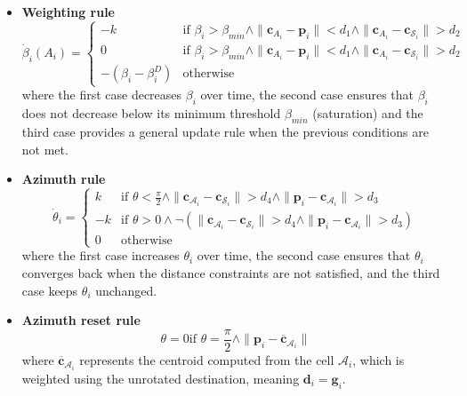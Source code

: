         \begin{itemize}
            \item \textbf{Weighting rule}
                \begin{equation}
                    \dot{\beta}_i(A_i) = 
                    \begin{cases}
                        -k & \text{if } \beta_i > \beta_{min} \land \|\mathbf{c}_{A_i} - \mathbf{p}_i\| < d_1 \land \|\mathbf{c}_{A_i} - \mathbf{c}_{\mathcal{S}_i}\| > d_2  \\
                        0  & \text{if } \beta_i > \beta_{min} \land \|\mathbf{c}_{A_i} - \mathbf{p}_i\| < d_1 \land \|\mathbf{c}_{A_i} - \mathbf{c}_{\mathcal{S}_i}\| > d_2  \\
                        -(\beta_i - \beta_i^D) & \text{otherwise}
                    \end{cases}
                \end{equation}
                where the first case decreases $\beta_i$ over time, the second case ensures that $\beta_i$ does not decrease below its minimum threshold $\beta_{min}$ (saturation) and the third case provides a general update rule when the previous conditions are not met.
            \item \textbf{Azimuth rule}
                \begin{equation}
                    \dot{\theta}_i = 
                    \begin{cases}
                        k  & \text{if } \theta < \frac{\pi}{2} \land \|\mathbf{c}_{\mathcal{A}_i} - \mathbf{c}_{\mathcal{S}_i}\| > d_4 \land \|\mathbf{p}_i - \mathbf{c}_{\mathcal{A}_i}\| > d_3 \\
                        -k & \text{if } \theta > 0 \land \neg (\|\mathbf{c}_{\mathcal{A}_i} - \mathbf{c}_{\mathcal{S}_i}\| > d_4 \land \|\mathbf{p}_i - \mathbf{c}_{\mathcal{A}_i}\| > d_3) \\
                        0  & \text{otherwise}
                    \end{cases}
                \end{equation}
                where the first case increases $\theta_i$ over time, the second case ensures that $\theta_i$ converges back when the distance constraints are not satisfied, and the third case keeps $\theta_i$ unchanged.
            \item \textbf{Azimuth reset rule}
                \begin{equation}
                    \theta = 0 \text{if } \theta = \frac{\pi}{2} \land \| \mathbf{p}_i - \mathbf{\overline{c}}_{\mathcal{A}_i} \|    
                \end{equation}
                where $\mathbf{\overline{c}}_{\mathcal{A}_i}$ represents the centroid computed from the cell $\mathcal{A}_i$, which is weighted using the unrotated destination, meaning $\mathbf{d}_i = \mathbf{g}_i$.
        \end{itemize}
